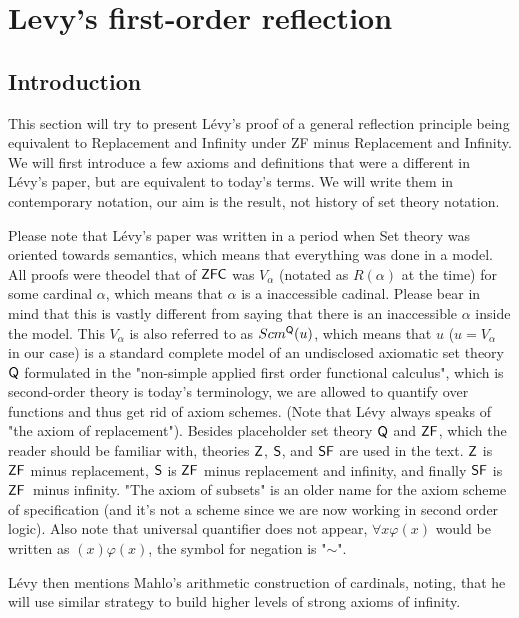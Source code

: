 \documentclass[12pt,a4paper]{article}
\begin{document}
\newpage
\section{Levy's first-order reflection}\label{sec:fixed}  %

\subsection{Introduction}
This section will try to present Lévy's proof of a general reflection principle being equivalent to Replacement and Infinity under ZF minus Replacement and Infinity.
We will first introduce a few axioms and definitions that were a different in Lévy's paper\cite{Levy60a}, but are equivalent to today's terms. We will write them in contemporary notation, our aim is the result, not history of set theory notation. 

Please note that Lévy's paper was written in a period when Set theory was oriented towards semantics, which means that everything was done in a model. All proofs were theodel that of $\sf{ZFC}$ was $V_\alpha$ (notated as $R(\alpha)$ at the time) for some cardinal $\alpha$, which means that $\alpha$ is a inaccessible cadinal. Please bear in mind that this is vastly different from saying that there is an inaccessible $\alpha$ inside the model. This $V_\alpha$ is also referred to as $Scm^{\sf{Q}}(u)$, which means that $u$ ($u=V_\alpha$ in our case) is a standard complete model of an undisclosed axiomatic set theory $\sf{Q}$ formulated in the "non-simple applied first order functional calculus", which is second-order theory is today's terminology, we are allowed to quantify over functions and thus get rid of axiom schemes. (Note that Lévy always speaks of "the axiom of replacement"). Besides placeholder set theory $\sf{Q}$ and $\sf{ZF}$, which the reader should be familiar with, theories $\sf{Z}$, $\sf{S}$, and $\sf{SF}$ are used in the text. $\sf{Z}$ is $\sf{ZF}$ minus replacement, $\sf{S}$ is $\sf{ZF}$ minus replacement and infinity, and finally $\sf{SF}$ is $\sf{ZF}$ minus infinity. "The axiom of subsets" is an older name for the axiom scheme of specification (and it's not a scheme since we are now working in second order logic). Also note that universal quantifier does not appear, $\forall x \varphi (x)$ would be written as $(x) \varphi (x)$, the symbol for negation is "$\sim$".

Lévy then mentions Mahlo's arithmetic construction of cardinals, noting, that he will use similar strategy to build higher levels of strong axioms of infinity. 
\end{document}

